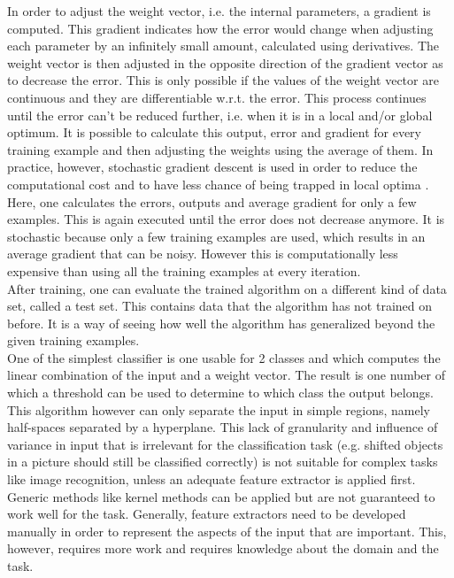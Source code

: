 \documentclass[a4paper, 11pt]{article}
\begin{document}
In order to adjust the weight vector, i.e. the internal parameters, a gradient is computed. This gradient indicates how the error would change when adjusting each parameter by an infinitely small amount, calculated using derivatives. The weight vector is then adjusted in the opposite direction of the gradient vector as to decrease the error. This is only possible if the values of the weight vector are continuous and they are differentiable w.r.t. the error.
This process continues until the error can't be reduced further, i.e. when it is in a local and/or global optimum.
It is possible to calculate this output, error and gradient for every training example and then adjusting the weights using the average of them.
In practice, however, stochastic gradient descent is used in order to reduce the computational cost and to have less chance of being trapped in local optima \citep{ML}.
Here, one calculates the errors, outputs and average gradient for only a few examples. This is again executed until the error does not decrease anymore. It is stochastic because only a few training examples are used, which results in an average gradient that can be noisy. However this is computationally less expensive than using all the training examples at every iteration.\\
After training, one can evaluate the trained algorithm on a different kind of data set, called a test set. This contains data that the algorithm has not trained on before. It is a way of seeing how well the algorithm has generalized beyond the given training examples.\\

One of the simplest classifier is one usable for 2 classes and which computes the linear combination of the input and a weight vector. The result is one number of which a threshold can be used to determine to which class the output belongs.
This algorithm however can only separate the input in simple regions, namely half-spaces separated by a hyperplane. This lack of granularity and influence of variance in input that is irrelevant for the classification task (e.g. shifted objects in a picture should still be classified correctly) is not suitable for complex tasks like image recognition, unless an adequate feature extractor is applied first. Generic methods like kernel methods can be applied but are not guaranteed to work well for the task.
Generally, feature extractors need to be developed manually in order to represent the aspects of the input that are important. This, however, requires more work and requires knowledge about the domain and the task.
\end{document}
